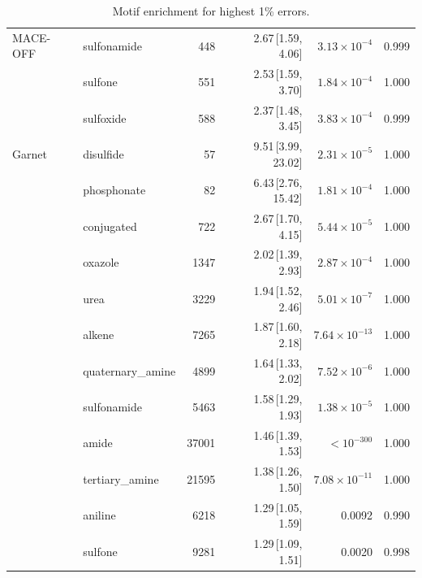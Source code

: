 \begin{table}[t]
\begin{tabular}{llrrrr}
    \hline
    MACE-OFF & sulfonamide & 448 & 2.67\,[1.59, 4.06] & $3.13\times 10^{-4}$ & 0.999 \\
      & sulfone & 551 & 2.53\,[1.59, 3.70] & $1.84\times 10^{-4}$ & 1.000 \\
      & sulfoxide & 588 & 2.37\,[1.48, 3.45] & $3.83\times 10^{-4}$ & 0.999 \\
    \hline
    Garnet & disulfide & 57 & 9.51\,[3.99, 23.02] & $2.31\times 10^{-5}$ & 1.000 \\
      & phosphonate & 82 & 6.43\,[2.76, 15.42] & $1.81\times 10^{-4}$ & 1.000 \\
      & conjugated & 722 & 2.67\,[1.70, 4.15] & $5.44\times 10^{-5}$ & 1.000 \\
      & oxazole & 1347 & 2.02\,[1.39, 2.93] & $2.87\times 10^{-4}$ & 1.000 \\
      & urea & 3229 & 1.94\,[1.52, 2.46] & $5.01\times 10^{-7}$ & 1.000 \\
      & alkene & 7265 & 1.87\,[1.60, 2.18] & $7.64\times 10^{-13}$ & 1.000 \\
      & quaternary\_amine & 4899 & 1.64\,[1.33, 2.02] & $7.52\times 10^{-6}$ & 1.000 \\
      & sulfonamide & 5463 & 1.58\,[1.29, 1.93] & $1.38\times 10^{-5}$ & 1.000 \\
      & amide & 37001 & 1.46\,[1.39, 1.53] & $< 10^{-300}$ & 1.000 \\
      & tertiary\_amine & 21595 & 1.38\,[1.26, 1.50] & $7.08\times 10^{-11}$ & 1.000 \\
      & aniline & 6218 & 1.29\,[1.05, 1.59] & 0.0092 & 0.990 \\
      & sulfone & 9281 & 1.29\,[1.09, 1.51] & 0.0020 & 0.998 \\
    \hline
  \end{tabular}
  \caption{Motif enrichment for highest 1\% errors.}
  \label{tab:split_structure_worst}
\end{table}